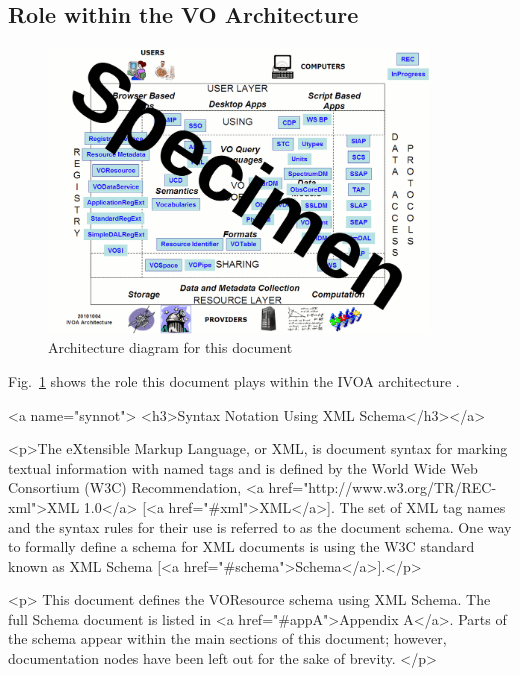 \documentclass[11pt,a4paper]{ivoa}
\begin{document}
\subsection{Role within the VO Architecture}

\begin{figure}
\centering


\includegraphics[width=0.9\textwidth]{archdiag.png}
\caption{Architecture diagram for this document}
\label{fig:archdiag}
\end{figure}

Fig.~\ref{fig:archdiag} shows the role this document plays within the
IVOA architecture \citep{note:VOARCH}.

<a name="synnot">
<h3>Syntax Notation Using XML Schema</h3></a>

<p>The eXtensible Markup Language, or XML, is document syntax for marking
textual information with named tags and is defined by the
World Wide Web Consortium (W3C) Recommendation,
<a href="http://www.w3.org/TR/REC-xml">XML 1.0</a>
[<a href="#xml">XML</a>].  The set of XML tag names and the syntax
rules for their use is referred to as the document schema.  One way to
formally define a schema for XML documents is using the W3C standard
known as XML Schema [<a href="#schema">Schema</a>].</p>

<p>
This document defines the VOResource schema using XML Schema.  The
full Schema document is listed in <a href="#appA">Appendix A</a>.
Parts of the schema appear within the main sections of this document;
however, documentation nodes have been left out for the sake of brevity.  
</p>
\end{document}
